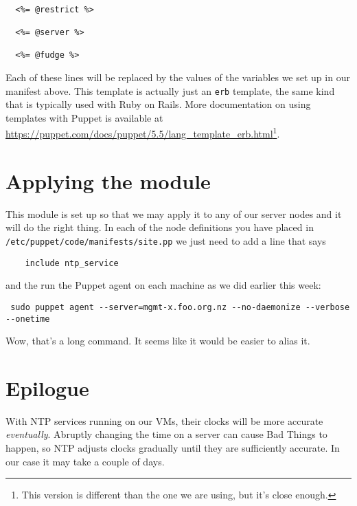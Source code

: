 \documentclass{article}   	%
\begin{document}
\begin{verbatim}

  <%= @restrict %>

  <%= @server %>

  <%= @fudge %>

\end{verbatim}

Each of these lines will be replaced by the values of the variables we set up in our manifest above. This template is actually just an \texttt{erb} template, the same kind that is typically used with Ruby on Rails. More documentation on using templates with Puppet is available at \url{https://puppet.com/docs/puppet/5.5/lang_template_erb.html}\footnote{This version is different than the one we are using, but it's close enough.}.


\section{Applying the module}
This module is set up so that we may apply it to any of our server nodes and it will do the right thing. In each of the node definitions you have placed in \texttt{/etc/puppet/code/manifests/site.pp} we just need to add a line that says

\begin{verbatim}
    include ntp_service
\end{verbatim}

and the run the Puppet agent on each machine as we did earlier this week:

\begin{verbatim}
 sudo puppet agent --server=mgmt-x.foo.org.nz --no-daemonize --verbose --onetime
\end{verbatim}

Wow, that's a long command. It seems like it would be easier to alias it.

\section{Epilogue}
With NTP services running on our VMs, their clocks will be more accurate \emph{eventually}. Abruptly changing the time on a server can cause Bad Things to happen, so NTP adjusts clocks gradually until they are sufficiently accurate. In our case it may take a couple of days.
\end{document}
